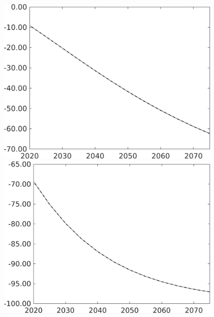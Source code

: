 \documentclass[12pt]{article}
\begin{document}
\begin{figure}[h!!]
\begin{minipage}[]{0.32\textwidth}
	\end{minipage}	
	\begin{minipage}[]{0.32\textwidth}
		\includegraphics[width=1\textwidth]{../../codding_model/own_basedOnFried/optimalPol_010922_revision/figures/all_13Sept22/PerdifNoTauf_Equlab_regime0_CompTaul_pg_spillover0_nsk0_xgr0_knspil1_sep1_LFlimit0_emsbase0_countec0_GovRev0_etaa0.79_lgd0.png}
	\end{minipage}	
	\begin{minipage}[]{0.32\textwidth}
		\includegraphics[width=1\textwidth]{../../codding_model/own_basedOnFried/optimalPol_010922_revision/figures/all_13Sept22/PerdifNoTauf_Equlab_regime0_CompTaul_pgpftf_spillover0_nsk0_xgr0_knspil1_sep1_LFlimit0_emsbase0_countec0_GovRev0_etaa0.79_lgd0.png}

\end{minipage}
\end{figure}
\end{document}
